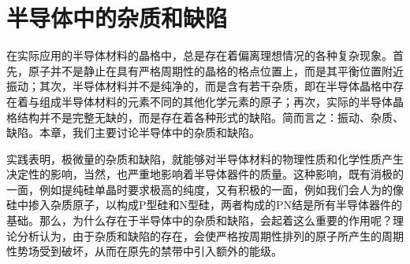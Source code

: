 \chapter{半导体中的杂质和缺陷}
在实际应用的半导体材料的晶格中，总是存在着偏离理想情况的各种复杂现象。首先，原子并不是静止在具有严格周期性的晶格的格点位置上，而是其平衡位置附近振动；其次，半导体材料并不是纯净的，而是含有若干杂质，即在半导体晶格中存在着与组成半导体材料的元素不同的其他化学元素的原子；再次，实际的半导体晶格结构并不是完整无缺的，而是存在着各种形式的缺陷。简而言之：振动、杂质、缺陷。本章，我们主要讨论半导体中的杂质和缺陷。

实践表明，极微量的杂质和缺陷，就能够对半导体材料的物理性质和化学性质产生决定性的影响，当然，也严重地影响着半导体器件的质量。这种影响，既有消极的一面，例如提纯硅单晶时要求极高的纯度，又有积极的一面，例如我们会人为的像硅中掺入杂质原子，以构成P型硅和N型硅，两者构成的PN结是所有半导体器件的基础。那么，为什么存在于半导体中的杂质和缺陷，会起着这么重要的作用呢？理论分析认为，由于杂质和缺陷的存在，会使严格按周期性排列的原子所产生的周期性势场受到破坏，从而在原先的禁带中引入额外的能级。


